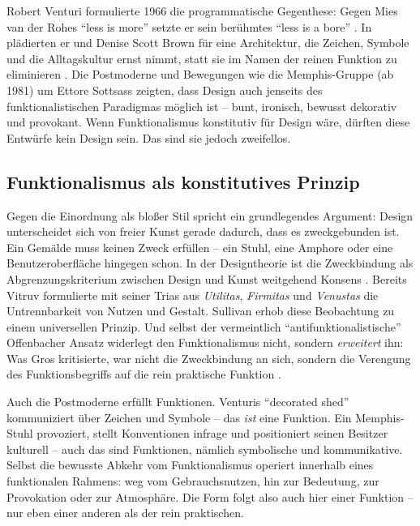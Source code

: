 \documentclass[
    a4paper,
    11pt,
    bibliography=totoc,
    listof=totoc,
    parskip=half,
    headings=normal
]{scrbook}
\begin{document}
Robert Venturi formulierte 1966 die programmatische Gegenthese: Gegen Mies van der Rohes \enquote{less is more} setzte er sein berühmtes \enquote{less is a bore} \autocite{wikiComplexityContradiction2025}. In  plädierten er und Denise Scott Brown für eine Architektur, die Zeichen, Symbole und die Alltagskultur ernst nimmt, statt sie im Namen der reinen Funktion zu eliminieren \autocite[vgl.][87\psqq]{venturiLernenVonLas1979}. Die Postmoderne und Bewegungen wie die Memphis-Gruppe (ab 1981) um Ettore Sottsass zeigten, dass Design auch jenseits des funktionalistischen Paradigmas möglich ist -- bunt, ironisch, bewusst dekorativ und provokant. Wenn Funktionalismus konstitutiv für Design wäre, dürften diese Entwürfe kein Design sein. Das sind sie jedoch zweifellos.

\subsection{Funktionalismus als konstitutives Prinzip}
Gegen die Einordnung als bloßer Stil spricht ein grundlegendes Argument: Design unterscheidet sich von freier Kunst gerade dadurch, dass es zweckgebunden ist. Ein Gemälde muss keinen Zweck erfüllen -- ein Stuhl, eine Amphore oder eine Benutzeroberfläche hingegen schon. In der Designtheorie ist die Zweckbindung als Abgrenzungskriterium zwischen Design und Kunst weitgehend Konsens \autocite[88\psq]{grosGrundlagenEinerTheorie2021}. Bereits Vitruv formulierte mit seiner Trias aus \textit{Utilitas}, \textit{Firmitas} und \textit{Venustas} die Untrennbarkeit von Nutzen und Gestalt. Sullivan erhob diese Beobachtung zu einem universellen Prinzip. Und selbst der vermeintlich \enquote{antifunktionalistische} Offenbacher Ansatz widerlegt den Funktionalismus nicht, sondern \textit{erweitert} ihn: Was Gros kritisierte, war nicht die Zweckbindung an sich, sondern die Verengung des Funktionsbegriffs auf die rein praktische Funktion \autocite[91\psq]{grosGrundlagenEinerTheorie2021}.

Auch die Postmoderne erfüllt Funktionen. Venturis \enquote{decorated shed} kommuniziert über Zeichen und Symbole -- das \textit{ist} eine Funktion. Ein Memphis-Stuhl provoziert, stellt Konventionen infrage und positioniert seinen Besitzer kulturell -- auch das sind Funktionen, nämlich symbolische und kommunikative. Selbst die bewusste Abkehr vom Funktionalismus operiert innerhalb eines funktionalen Rahmens: weg vom Gebrauchsnutzen, hin zur Bedeutung, zur Provokation oder zur Atmosphäre. Die Form folgt also auch hier einer Funktion -- nur eben einer anderen als der rein praktischen.
\end{document}
